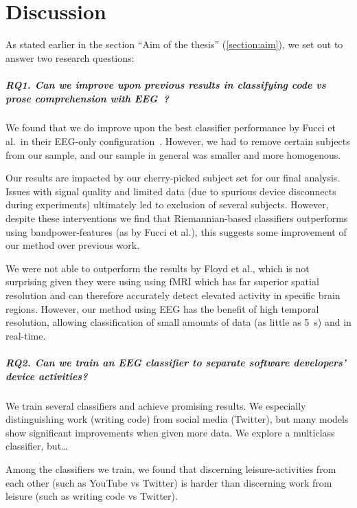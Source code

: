 \chapter{Discussion}\label{section:discussion}

As stated earlier in the section ``Aim of the thesis'' (\ref{section:aim}), we set out to answer two research questions:

\paragraph*{RQ1. Can we improve upon previous results in classifying code vs prose comprehension with EEG~?}

We found that we do improve upon the best classifier performance by Fucci et al.\ in their EEG-only configuration~\cite{fucci_replication_2019}. However, we had to remove certain subjects from our sample, and our sample in general was smaller and more homogenous. 

Our results are impacted by our cherry-picked subject set for our final analysis. Issues with signal quality and limited data (due to spurious device disconnects during experiments) ultimately led to exclusion of several subjects. However, despite these interventions we find that Riemannian-based classifiers outperforms using bandpower-features (as by Fucci et al.), this suggests some improvement of our method over previous work.

We were not able to outperform the results by Floyd et al., which is not surprising given they were using using fMRI which has far superior spatial resolution and can therefore accurately detect elevated activity in specific brain regions. However, our method using EEG has the benefit of high temporal resolution, allowing classification of small amounts of data (as little as \SI{5}{\second}) and in real-time.

\paragraph*{RQ2. Can we train an EEG classifier to separate software developers’ device activities?}

We train several classifiers and achieve promising results. We especially distinguishing work (writing code) from social media (Twitter), but many models show significant improvements when given more data. We  explore a multiclass classifier, but\ldots

Among the classifiers we train, we found that discerning leisure-activities from each other (such as YouTube vs Twitter) is harder than discerning work from leisure (such as writing code vs Twitter).

